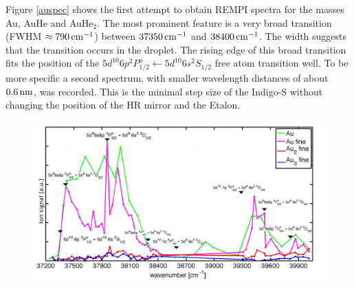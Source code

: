 \documentclass[parskip,12pt,headsepline,a4paper] {scrbook}
\begin{document}
Figure \ref{auspec} shows the first attempt to obtain REMPI spectra for the masses Au, AuHe and AuHe$_2$. The most prominent feature is a very broad transition (FWHM $\approx \unit[790]{cm^{-1}}$) between $\unit[37350]{cm^{-1}}$ and $\unit[38400]{cm^{-1}}$. The width suggests that the transition occurs in the droplet. The rising edge of this broad transition fits the position of the $5d^{10}6p ^2P^o_{1/2} \leftarrow 5d^{10}6s ^2S_{1/2}$ free atom transition well. To be more specific a second spectrum, with smaller wavelength distances of about $\unit[0.6]{nm}$, was recorded. This is the minimal step size of the Indigo-S without changing the position of the HR mirror and the Etalon.

\begin{figure}[ht]
\centerline{
\includegraphics[width=17cm]{./results/au_specFine_new.jpg}}
\end{figure}
\end{document}
